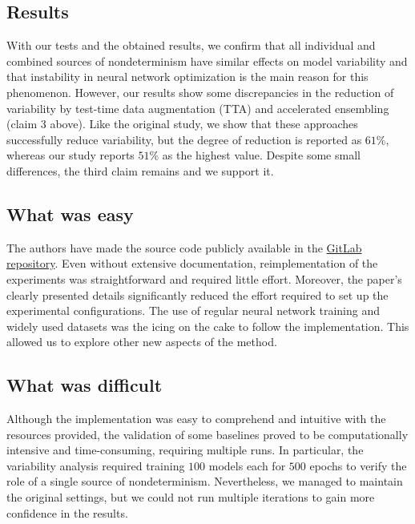 \subsection*{Results}
With our tests and the obtained results, we confirm that all individual and combined sources of nondeterminism have similar effects on model variability and that instability in neural network optimization is the main reason for this phenomenon. However, our results show some discrepancies in the reduction of variability by test-time data augmentation (TTA) and accelerated ensembling (claim 3 above). Like the original study, we show that these approaches successfully reduce variability, but the degree of reduction is reported as $61\%$, whereas our study reports $51\%$ as the highest value. Despite some small differences, the third claim remains and we support it.

\subsection*{What was easy}

The authors have made the source code publicly available in the \href{https://github.com/ceciliaresearch/nondeterminism_instability}{GitLab repository}. Even without extensive documentation, reimplementation of the experiments was straightforward and required little effort. Moreover, the paper's clearly presented details significantly reduced the effort required to set up the experimental configurations. The use of regular neural network training and widely used datasets was the icing on the cake to follow the implementation. This allowed us to explore other new aspects of the method.

\subsection*{What was difficult}

Although the implementation was easy to comprehend and intuitive with the resources provided, the validation of some baselines proved to be computationally intensive and time-consuming, requiring multiple runs. In particular, the variability analysis required training $100$ models each for $500$ epochs to verify the role of a single source of nondeterminism. Nevertheless, we managed to maintain the original settings, but we could not run multiple iterations to gain more confidence in the results.

